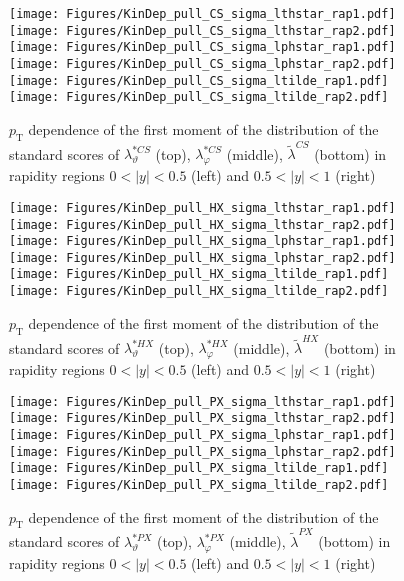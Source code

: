 \documentclass[12pt]{article}
\newcommand{\pT}{p_\mathrm{T}}
\newcommand{\absy}{\left |  y \right |}
\newcommand{\lamtildeCS}{\tilde{\lambda}^{\scriptscriptstyle CS}}
\newcommand{\lamthstarCS}{\lambda^{* \scriptscriptstyle CS}_\vartheta}
\newcommand{\lamphstarCS}{\lambda^{* \scriptscriptstyle CS}_\varphi}
\newcommand{\lamtildeHX}{\tilde{\lambda}^{\scriptscriptstyle HX}}
\newcommand{\lamthstarHX}{\lambda^{* \scriptscriptstyle HX}_\vartheta}
\newcommand{\lamphstarHX}{\lambda^{* \scriptscriptstyle HX}_\varphi}
\newcommand{\lamtildePX}{\tilde{\lambda}^{\scriptscriptstyle PX}}
\newcommand{\lamthstarPX}{\lambda^{* \scriptscriptstyle PX}_\vartheta}
\newcommand{\lamphstarPX}{\lambda^{* \scriptscriptstyle PX}_\varphi}
\begin{document}
\begin{figure}[htbp]
\centering
\texttt{[image: Figures/KinDep\_pull\_CS\_sigma\_lthstar\_rap1.pdf]}
\texttt{[image: Figures/KinDep\_pull\_CS\_sigma\_lthstar\_rap2.pdf]}
\texttt{[image: Figures/KinDep\_pull\_CS\_sigma\_lphstar\_rap1.pdf]}
\texttt{[image: Figures/KinDep\_pull\_CS\_sigma\_lphstar\_rap2.pdf]}
\texttt{[image: Figures/KinDep\_pull\_CS\_sigma\_ltilde\_rap1.pdf]}
\texttt{[image: Figures/KinDep\_pull\_CS\_sigma\_ltilde\_rap2.pdf]}
\caption{$\pT$ dependence of the first moment of the distribution of the
standard scores of $\lamthstarCS$ (top), $\lamphstarCS$ (middle), $\lamtildeCS$
(bottom) in rapidity regions $0<\absy<0.5$ (left) and $0.5<\absy<1$ (right)}
\end{figure}
\clearpage


\begin{figure}[htbp]
\centering
\texttt{[image: Figures/KinDep\_pull\_HX\_sigma\_lthstar\_rap1.pdf]}
\texttt{[image: Figures/KinDep\_pull\_HX\_sigma\_lthstar\_rap2.pdf]}
\texttt{[image: Figures/KinDep\_pull\_HX\_sigma\_lphstar\_rap1.pdf]}
\texttt{[image: Figures/KinDep\_pull\_HX\_sigma\_lphstar\_rap2.pdf]}
\texttt{[image: Figures/KinDep\_pull\_HX\_sigma\_ltilde\_rap1.pdf]}
\texttt{[image: Figures/KinDep\_pull\_HX\_sigma\_ltilde\_rap2.pdf]}
\caption{$\pT$ dependence of the first moment of the distribution of the
standard scores of $\lamthstarHX$ (top), $\lamphstarHX$ (middle), $\lamtildeHX$
(bottom) in rapidity regions $0<\absy<0.5$ (left) and $0.5<\absy<1$ (right)}
\end{figure}
\clearpage


\begin{figure}[htbp]
\centering
\texttt{[image: Figures/KinDep\_pull\_PX\_sigma\_lthstar\_rap1.pdf]}
\texttt{[image: Figures/KinDep\_pull\_PX\_sigma\_lthstar\_rap2.pdf]}
\texttt{[image: Figures/KinDep\_pull\_PX\_sigma\_lphstar\_rap1.pdf]}
\texttt{[image: Figures/KinDep\_pull\_PX\_sigma\_lphstar\_rap2.pdf]}
\texttt{[image: Figures/KinDep\_pull\_PX\_sigma\_ltilde\_rap1.pdf]}
\texttt{[image: Figures/KinDep\_pull\_PX\_sigma\_ltilde\_rap2.pdf]}
\caption{$\pT$ dependence of the first moment of the distribution of the
standard scores of $\lamthstarPX$ (top), $\lamphstarPX$ (middle), $\lamtildePX$
(bottom) in rapidity regions $0<\absy<0.5$ (left) and $0.5<\absy<1$ (right)}
\end{figure}
\clearpage
\end{document}
